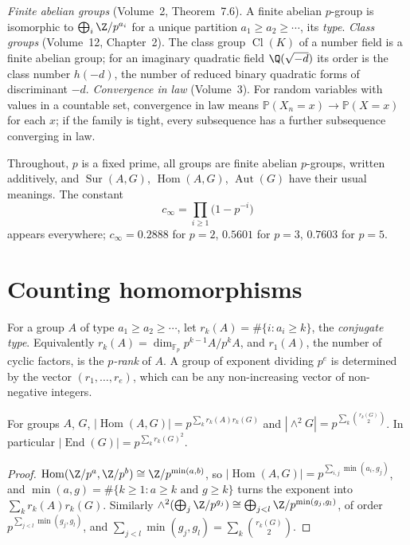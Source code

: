 \begin{reminder}
\emph{Finite abelian groups} (Volume~2, Theorem~7.6). A finite abelian $p$-group is isomorphic to $\bigoplus_i\Z/p^{a_i}$ for a unique partition $a_1\ge a_2\ge\cdots$, its \emph{type}.
\emph{Class groups} (Volume~12, Chapter~2). The class group $\operatorname{Cl}(K)$ of a number field is a finite abelian group; for an imaginary quadratic field $\Q(\sqrt{-d})$ its order is the class number $h(-d)$, the number of reduced binary quadratic forms of discriminant $-d$.
\emph{Convergence in law} (Volume~3). For random variables with values in a countable set, convergence in law means $\mathbb P(X_n=x)\to\mathbb P(X=x)$ for each $x$; if the family is tight, every subsequence has a further subsequence converging in law.
\end{reminder}

Throughout, $p$ is a fixed prime, all groups are finite abelian $p$-groups, written additively, and $\operatorname{Sur}(A,G)$, $\operatorname{Hom}(A,G)$, $\operatorname{Aut}(G)$ have their usual meanings. The constant
\[
c_\infty=\prod_{i\ge1}\bigl(1-p^{-i}\bigr)
\]
appears everywhere; $c_\infty=0.2888$ for $p=2$, $0.5601$ for $p=3$, $0.7603$ for $p=5$.

\section{Counting homomorphisms}

For a group $A$ of type $a_1\ge a_2\ge\cdots$, let $r_k(A)=\#\{i:a_i\ge k\}$, the \emph{conjugate type}. Equivalently $r_k(A)=\dim_{\mathbb F_p}p^{k-1}A/p^kA$, and $r_1(A)$, the number of cyclic factors, is the \emph{$p$-rank} of $A$. A group of exponent dividing $p^e$ is determined by the vector $(r_1,\dots,r_e)$, which can be any non-increasing vector of non-negative integers.

\begin{lemma}\label{lem:homcount}
For groups $A$, $G$, $|\operatorname{Hom}(A,G)|=p^{\sum_kr_k(A)r_k(G)}$ and $|\wedge^2G|=p^{\sum_k\binom{r_k(G)}2}$. In particular $|\operatorname{End}(G)|=p^{\sum_kr_k(G)^2}$.
\end{lemma}
\begin{proof}
$\operatorname{Hom}(\Z/p^a,\Z/p^b)\cong\Z/p^{\min(a,b)}$, so $|\operatorname{Hom}(A,G)|=p^{\sum_{i,j}\min(a_i,g_j)}$, and $\min(a,g)=\#\{k\ge1:a\ge k\text{ and }g\ge k\}$ turns the exponent into $\sum_kr_k(A)r_k(G)$. Similarly $\wedge^2(\bigoplus_j\Z/p^{g_j})\cong\bigoplus_{j<l}\Z/p^{\min(g_j,g_l)}$, of order $p^{\sum_{j<l}\min(g_j,g_l)}$, and $\sum_{j<l}\min(g_j,g_l)=\sum_k\binom{r_k(G)}2$.
\end{proof}

